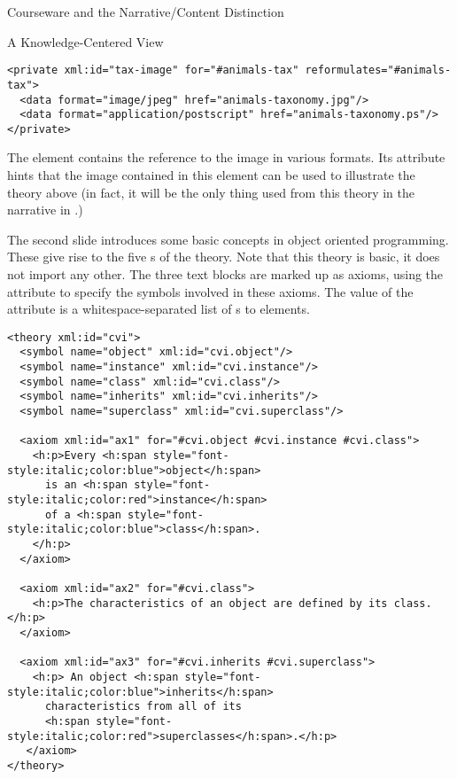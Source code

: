 \begin{omgroup}[id=courseware]{Courseware and the Narrative/Content Distinction}
\begin{omgroup}[id=courseware.knowledge-centered]{A Knowledge-Centered View}
\begin{lstlisting}[label=lst:ann-tax,mathescape,
    caption={The {\omdoc} Representation for Slide 1 from {\myfigref{15-211}}},
    index={theory,axiom,symbol,h:p,FMP,OMA,OMS,private,data}]
<private xml:id="tax-image" for="#animals-tax" reformulates="#animals-tax">
  <data format="image/jpeg" href="animals-taxonomy.jpg"/>
  <data format="application/postscript" href="animals-taxonomy.ps"/>
</private>
\end{lstlisting}
The {} element contains the reference to the image in various
formats. Its {} attribute hints that the image
contained in this element can be used to illustrate the theory above (in fact, it
will be the only thing used from this theory in the narrative {\omdoc} in
{}.)

The second slide introduces some basic concepts in object oriented programming.  These
give rise to the five {s} of the theory. Note that this theory
is basic, it does not import any other. The three text blocks are marked up as axioms,
using the attribute {} to specify the symbols involved in these
axioms. The value of the {} attribute is a whitespace-separated list
of {s} to {} elements.

\begin{lstlisting}[label=lst:ann-oo,
    caption={The {\omdoc} Representation for Slide 2 from {\myfigref{15-211}}},
    index={theory,axiom,symbol,h:p,FMP,OMA,OMS}]
<theory xml:id="cvi">
  <symbol name="object" xml:id="cvi.object"/>
  <symbol name="instance" xml:id="cvi.instance"/>
  <symbol name="class" xml:id="cvi.class"/>
  <symbol name="inherits" xml:id="cvi.inherits"/>
  <symbol name="superclass" xml:id="cvi.superclass"/>

  <axiom xml:id="ax1" for="#cvi.object #cvi.instance #cvi.class">
    <h:p>Every <h:span style="font-style:italic;color:blue">object</h:span>
      is an <h:span style="font-style:italic;color:red">instance</h:span> 
      of a <h:span style="font-style:italic;color:blue">class</h:span>.
    </h:p>
  </axiom>

  <axiom xml:id="ax2" for="#cvi.class">
    <h:p>The characteristics of an object are defined by its class.</h:p>
  </axiom>

  <axiom xml:id="ax3" for="#cvi.inherits #cvi.superclass">
    <h:p> An object <h:span style="font-style:italic;color:blue">inherits</h:span>
      characteristics from all of its 
      <h:span style="font-style:italic;color:red">superclasses</h:span>.</h:p>
   </axiom>
</theory>
\end{lstlisting}


\end{omgroup}
\end{omgroup}
